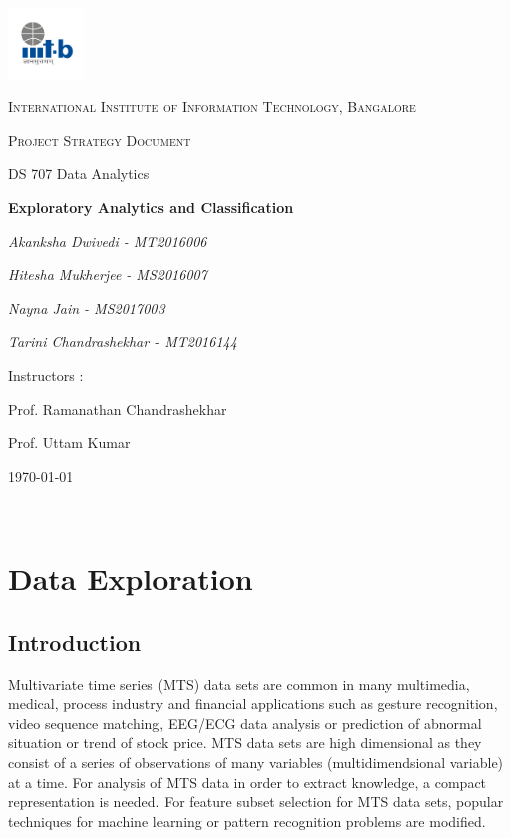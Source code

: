 \documentclass{article}
\begin{document}
\begin{titlepage}
	\centering
	\includegraphics[width=0.15\textwidth]{IIIT-B_logo.jpg}\par\vspace{1cm}
	{\scshape\LARGE International Institute of Information Technology, Bangalore \par}
	\vspace{1cm}
	{\scshape\Large Project Strategy Document\par}
	{\Large  DS 707 Data Analytics\par}
	\vspace{1.5cm}
	{\huge\bfseries Exploratory Analytics and Classification \par}
	\vspace{2cm}
	{\Large\itshape Akanksha Dwivedi - MT2016006\par}
	{\Large\itshape Hitesha Mukherjee - MS2016007\par}
	{\Large\itshape Nayna Jain - MS2017003\par}
	{\Large\itshape Tarini Chandrashekhar - MT2016144\par}
	\vfill
	Instructors : \par
	Prof. Ramanathan Chandrashekhar
	\par
	Prof. Uttam Kumar

	\vfill
	{\large \today\par}
\end{titlepage}

\newpage

\tableofcontents

\newpage
\justify

\

\section{Data Exploration}

\subsection {Introduction}
Multivariate time series (MTS) data sets are common in many multimedia, medical, process industry and financial applications such as gesture recognition, video sequence matching, EEG/ECG data analysis or prediction of abnormal situation or trend of stock price. MTS data sets are high dimensional as they consist of a series of observations of many variables (multidimendsional variable) at a time.
For analysis of MTS data in order to extract knowledge, a compact representation is needed. For feature subset selection for MTS data sets, popular techniques for machine learning or pattern recognition problems are modified.\newline
\end{document}
